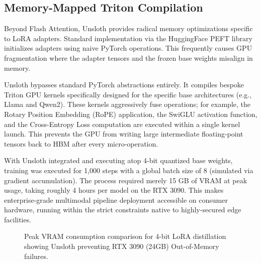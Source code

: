 \subsection{Memory-Mapped Triton Compilation}
Beyond Flash Attention, Unsloth provides radical memory optimizations specific to LoRA adapters. Standard implementation via the HuggingFace PEFT \citep{peft_houlsby} library initializes adapters using naive PyTorch operations. This frequently causes GPU fragmentation where the adapter tensors and the frozen base weights misalign in memory.

Unsloth bypasses standard PyTorch abstractions entirely. It compiles bespoke Triton \citep{triton} GPU kernels specifically designed for the specific base architectures (e.g., Llama and Qwen2). These kernels aggressively fuse operations; for example, the Rotary Position Embedding (RoPE) application, the SwiGLU activation function, and the Cross-Entropy Loss computation are executed within a single kernel launch. This prevents the GPU from writing large intermediate floating-point tensors back to HBM after every micro-operation.

With Unsloth integrated and executing atop 4-bit quantized base weights, training was executed for 1,000 steps with a global batch size of 8 (simulated via gradient accumulation). The process required merely 15 GB of VRAM at peak usage, taking roughly 4 hours per model on the RTX 3090. This makes enterprise-grade multimodal pipeline deployment accessible on consumer hardware, running within the strict constraints native to highly-secured edge facilities.

\begin{figure}[htbp]
\centering
{}
\caption{Peak VRAM consumption comparison for 4-bit LoRA distillation showing Unsloth preventing RTX 3090 (24GB) Out-of-Memory failures.}
\label{fig:unsloth_vram}
\end{figure}

